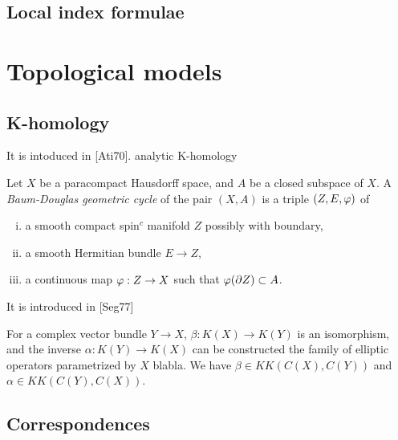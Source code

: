 \documentclass{../../large}
\begin{document}
\section{Local index formulae}
















\chapter{Topological models}

\section{K-homology}

\begin{prb}
It is intoduced in [Ati70].
analytic K-homology
\end{prb}


\begin{prb}
Let $X$ be a paracompact Hausdorff space, and $A$ be a closed subspace of $X$.
A \emph{Baum-Douglas geometric cycle} of the pair $(X,A)$ is a triple $(Z,E,\varphi)$ of 
\begin{enumerate}[(i)]
\item a smooth compact spin$^c$ manifold $Z$ possibly with boundary,
\item a smooth Hermitian bundle $E\to Z$,
\item a continuous map $\varphi:Z\to X$ such that $\varphi(\partial Z)\subset A$.
\end{enumerate}
\end{prb}


\begin{prb}
It is introduced in [Seg77]
\end{prb}





For a complex vector bundle $Y\to X$, $\beta:K(X)\to K(Y)$ is an isomorphism, and the inverse $\alpha:K(Y)\to K(X)$ can be constructed the family of elliptic operators parametrized by $X$ blabla.
We have $\beta\in KK(C(X),C(Y))$ and $\alpha\in KK(C(Y),C(X))$.

\section{Correspondences}
\end{document}
